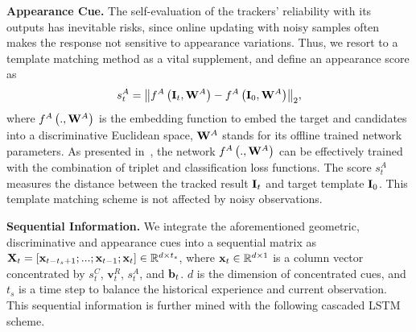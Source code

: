 \documentclass[10pt,twocolumn,letterpaper]{article}
\begin{document}
\noindent \textbf{Appearance Cue.} The self-evaluation of the trackers' reliability with its
outputs has inevitable risks, since online updating with noisy samples often makes the response not
sensitive to appearance variations.
Thus, we resort to a template matching method as a vital supplement, and define an appearance
score as
\begin{equation}
s_t^A = {\left\| {{f^A}\left( {{{\bf{I}}_t},{{\bf{W}}^A}} \right) -
{f^A}\left( {{{\bf{I}}_0},{{\bf{W}}^A}} \right)} \right\|_2},
\end{equation}
where ${f^A}\left( {.,{{\bf{W}}^A}} \right)$ is the embedding function to embed the target
and candidates into a discriminative Euclidean space, ${{\bf{W}}^A}$ stands for its offline
trained network parameters.
As presented in~\cite{Luo2019}, the network ${f^A}\left( {.,{{\bf{W}}^A}} \right)$
can be effectively trained with the combination of triplet and classification loss functions.
The score $s_t^A $ measures the distance between the tracked result ${\bf{I}}_t$ and target
template ${\bf{I}}_0$.
This template matching scheme is not affected by noisy observations.

\noindent \textbf{Sequential Information.}
We integrate the aforementioned geometric, discriminative and appearance cues into
a sequential matrix as
${{\bf{X}}_t} = [{{\bf{x}}_{t - {t_s} + 1}};...;{{\bf{x}}_{t - 1}};{{\bf{x}}_t}] \in
{\mathbb{R}^{d \times {t_s} }}$, where ${{\bf{x}}_t} \in {\mathbb{R}^{d \times {1}}}$
is a column vector concentrated by $s_t^C$, $\mathbf{v}_t^R$, $s_t^A$, and ${{\bf{b}}_t}$.
$d$ is the dimension of concentrated cues, and $t_s$ is a time step to balance the
historical experience and current observation.
This sequential information is further mined with the following cascaded LSTM scheme.
\vspace{-4mm}
\end{document}
